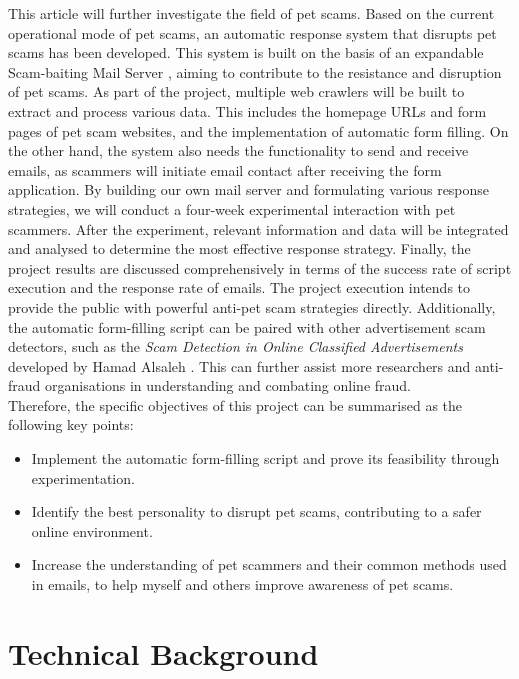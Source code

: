 \documentclass[ oneside,%
                    author={Cassie Qing Tang},
                    degree={BSc},
                     title={An Automated Response System for Disrupting Online Pet Scamming \\ },
                    subtitle={ }]{dissertation}
\begin{document}
This article will further investigate the field of pet scams. Based on the current operational mode of pet scams, an automatic response system that disrupts pet scams has been developed. This system is built on the basis of an expandable Scam-baiting Mail Server \cite{an19352_an19352scambaiter_back_2023}, aiming to contribute to the resistance and disruption of pet scams. As part of the project, multiple web crawlers will be built to extract and process various data. This includes the homepage URLs and form pages of pet scam websites, and the implementation of automatic form filling. On the other hand, the system also needs the functionality to send and receive emails, as scammers will initiate email contact after receiving the form application. By building our own mail server and formulating various response strategies, we will conduct a four-week experimental interaction with pet scammers. After the experiment, relevant information and data will be integrated and analysed to determine the most effective response strategy. Finally, the project results are discussed comprehensively in terms of the success rate of script execution and the response rate of emails. The project execution intends to provide the public with powerful anti-pet scam strategies directly. Additionally, the automatic form-filling script can be paired with other advertisement scam detectors, such as the \textit{Scam Detection in Online Classified Advertisements} developed by Hamad Alsaleh \cite{alsaleh_scam_2017}. This can further assist more researchers and anti-fraud organisations in understanding and combating online fraud.
\\

Therefore, the specific objectives of this project can be summarised as the following key points:

\begin{itemize}
  \item Implement the automatic form-filling script and prove its feasibility through experimentation.
  \item Identify the best personality to disrupt pet scams, contributing to a safer online environment.
  \item Increase the understanding of pet scammers and their common methods used in emails, to help myself and others improve awareness of pet scams.
\end{itemize}


\chapter{Technical Background}
\end{document}
